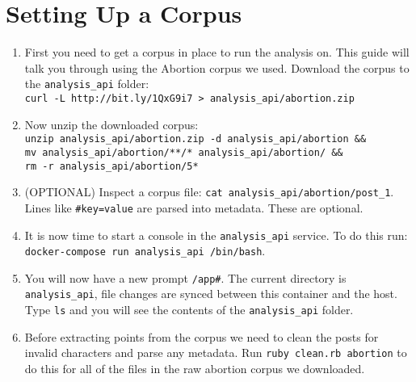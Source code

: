 \section{Setting Up a Corpus}
\begin{enumerate}
	\item{First you need to get a corpus in place to run the analysis on. This guide will talk you through using the Abortion corpus we used. Download the corpus to the \texttt{analysis\_api} folder: \\  \texttt{curl -L http://bit.ly/1QxG9i7 > analysis\_api/abortion.zip}}
	\item{Now unzip the downloaded corpus: \\ \texttt{unzip analysis\_api/abortion.zip -d analysis\_api/abortion \&\& \\ mv analysis\_api/abortion/**/* analysis\_api/abortion/ \&\& \\ rm -r analysis\_api/abortion/5*}}
	\item{(OPTIONAL) Inspect a corpus file: \texttt{cat analysis\_api/abortion/post\_1}. Lines like \texttt{\#key=value} are parsed into metadata. These are optional.}
	\item{It is now time to start a console in the \texttt{analysis\_api} service. To do this run: \texttt{docker-compose run analysis\_api /bin/bash}.}
	\item{You will now have a new prompt \texttt{/app\#}. The current directory is \texttt{analysis\_api}, file changes are synced between this container and the host. Type \texttt{ls} and you will see the contents of the \texttt{analysis\_api} folder.}
	\item{Before extracting points from the corpus we need to clean the posts for invalid characters and parse any metadata. Run \texttt{ruby clean.rb abortion} to do this for all of the files in the raw abortion corpus we downloaded.}
\end{enumerate}

